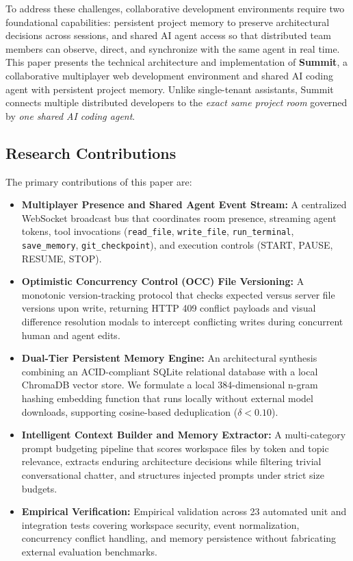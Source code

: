 \documentclass[conference]{IEEEtran}
\begin{document}
To address these challenges, collaborative development environments require two foundational capabilities: persistent project memory to preserve architectural decisions across sessions, and shared AI agent access so that distributed team members can observe, direct, and synchronize with the same agent in real time. This paper presents the technical architecture and implementation of \textbf{Summit}, a collaborative multiplayer web development environment and shared AI coding agent with persistent project memory. Unlike single-tenant assistants, Summit connects multiple distributed developers to the \textit{exact same project room} governed by \textit{one shared AI coding agent}. 

\subsection{Research Contributions}
The primary contributions of this paper are:
\begin{itemize}
    \item \textbf{Multiplayer Presence and Shared Agent Event Stream:} A centralized WebSocket broadcast bus that coordinates room presence, streaming agent tokens, tool invocations (\texttt{read\_file}, \texttt{write\_file}, \texttt{run\_terminal}, \texttt{save\_memory}, \texttt{git\_checkpoint}), and execution controls (\textsf{START}, \textsf{PAUSE}, \textsf{RESUME}, \textsf{STOP}).
    \item \textbf{Optimistic Concurrency Control (OCC) File Versioning:} A monotonic version-tracking protocol that checks expected versus server file versions upon write, returning HTTP 409 conflict payloads and visual difference resolution modals to intercept conflicting writes during concurrent human and agent edits.
    \item \textbf{Dual-Tier Persistent Memory Engine:} An architectural synthesis combining an ACID-compliant SQLite relational database with a local ChromaDB vector store. We formulate a local 384-dimensional n-gram hashing embedding function that runs locally without external model downloads, supporting cosine-based deduplication ($\delta < 0.10$).
    \item \textbf{Intelligent Context Builder and Memory Extractor:} A multi-category prompt budgeting pipeline that scores workspace files by token and topic relevance, extracts enduring architecture decisions while filtering trivial conversational chatter, and structures injected prompts under strict size budgets.
    \item \textbf{Empirical Verification:} Empirical validation across 23 automated unit and integration tests covering workspace security, event normalization, concurrency conflict handling, and memory persistence without fabricating external evaluation benchmarks.
\end{itemize}
\end{document}
